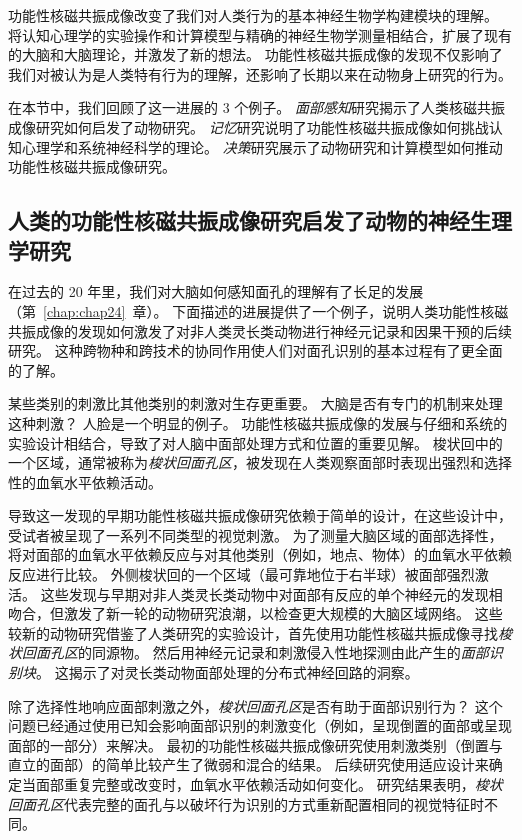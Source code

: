功能性核磁共振成像改变了我们对人类行为的基本神经生物学构建模块的理解。
将认知心理学的实验操作和计算模型与精确的神经生物学测量相结合，扩展了现有的大脑和大脑理论，并激发了新的想法。
功能性核磁共振成像的发现不仅影响了我们对被认为是人类特有行为的理解，还影响了长期以来在动物身上研究的行为。


在本节中，我们回顾了这一进展的 3 个例子。
\textit{面部感知}研究揭示了人类核磁共振成像研究如何启发了动物研究。
\textit{记忆}研究说明了功能性核磁共振成像如何挑战认知心理学和系统神经科学的理论。
\textit{决策}研究展示了动物研究和计算模型如何推动功能性核磁共振成像研究。


\subsection{人类的功能性核磁共振成像研究启发了动物的神经生理学研究}

在过去的 20 年里，我们对大脑如何感知面孔的理解有了长足的发展（第~\ref{chap:chap24}~章）。 
下面描述的进展提供了一个例子，说明人类功能性核磁共振成像的发现如何激发了对非人类灵长类动物进行神经元记录和因果干预的后续研究。
这种跨物种和跨技术的协同作用使人们对面孔识别的基本过程有了更全面的了解。


某些类别的刺激比其他类别的刺激对生存更重要。 
大脑是否有专门的机制来处理这种刺激？ 
人脸是一个明显的例子。 
功能性核磁共振成像的发展与仔细和系统的实验设计相结合，导致了对人脑中面部处理方式和位置的重要见解。 
梭状回中的一个区域，通常被称为\textit{梭状回面孔区}，被发现在人类观察面部时表现出强烈和选择性的血氧水平依赖活动。


导致这一发现的早期功能性核磁共振成像研究依赖于简单的设计，在这些设计中，受试者被呈现了一系列不同类型的视觉刺激。
为了测量大脑区域的面部选择性，将对面部的血氧水平依赖反应与对其他类别（例如，地点、物体）的血氧水平依赖反应进行比较。 
外侧梭状回的一个区域（最可靠地位于右半球）被面部强烈激活。
这些发现与早期对非人类灵长类动物中对面部有反应的单个神经元的发现相吻合，但激发了新一轮的动物研究浪潮，以检查更大规模的大脑区域网络。
这些较新的动物研究借鉴了人类研究的实验设计，首先使用功能性核磁共振成像寻找\textit{梭状回面孔区}的同源物。
然后用神经元记录和刺激侵入性地探测由此产生的\textit{面部识别块}。
这揭示了对灵长类动物面部处理的分布式神经回路的洞察。


除了选择性地响应面部刺激之外，\textit{梭状回面孔区}是否有助于面部识别行为？ 
这个问题已经通过使用已知会影响面部识别的刺激变化（例如，呈现倒置的面部或呈现面部的一部分）来解决。 
最初的功能性核磁共振成像研究使用刺激类别（倒置与直立的面部）的简单比较产生了微弱和混合的结果。
后续研究使用适应设计来确定当面部重复完整或改变时，血氧水平依赖活动如何变化。
研究结果表明，\textit{梭状回面孔区}代表完整的面孔与以破坏行为识别的方式重新配置相同的视觉特征时不同。


